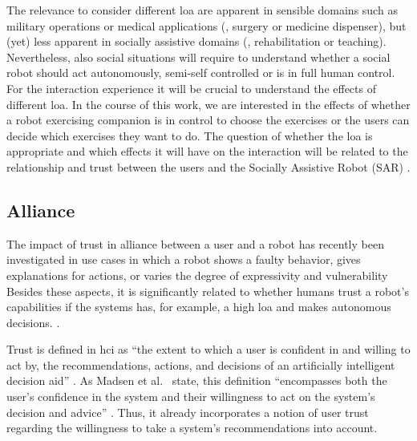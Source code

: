 \documentclass[twocolumn]{svjour3}          %
\begin{document}
The relevance to consider different \gls{loa} are apparent in sensible domains
such as military operations or medical applications (\eg{}, surgery or
medicine dispenser), but (yet) less apparent in socially assistive
domains (\eg{}, rehabilitation or teaching). Nevertheless, also social
situations will require to understand whether a social robot should act
autonomously, semi-self controlled or is in full human control. For the
interaction experience it will be crucial to understand the effects of
different \gls{loa}. In the course of this work, we are interested in the
effects of whether a robot exercising companion is in control to choose
the exercises or the users can decide which exercises they want to do.
The question of whether the \gls{loa} is appropriate and which effects it will
have on the interaction will be related to the relationship and trust
between the users and the Socially Assistive Robot (SAR)
\autocite{beer2014toward}.

\hypertarget{alliance-and-trust}{%
\subsection{Alliance}\label{alliance-and-trust}}

The impact of trust in alliance between a user and a robot has recently been investigated in use cases in which a
robot shows a faulty behavior, gives explanations for actions, or varies
the degree of expressivity and vulnerability
\autocite{salem2015would,robinette2016overtrust,Wang,Martelaro} Besides
these aspects, it is significantly related to whether humans trust a
robot's capabilities if the systems has, for example, a high \gls{loa} and makes autonomous decisions.
\autocite{freedy2007measurement}.

Trust is defined in \gls{hci} as \enquote{the extent
to which a user is confident in and willing to act by, the
recommendations, actions, and decisions of an artificially intelligent
decision aid} \autocite[p.~25]{mcallister1995affect}. As Madsen et
al.~\autocite{madsen2000measuring} state, this definition
\enquote{encompasses both the user's confidence in the system and their
willingness to act on the system's decision and advice}
\autocite[p.~1]{madsen2000measuring}. Thus, it already incorporates a
notion of user trust regarding the willingness to take a system's
recommendations into account.
\end{document}
